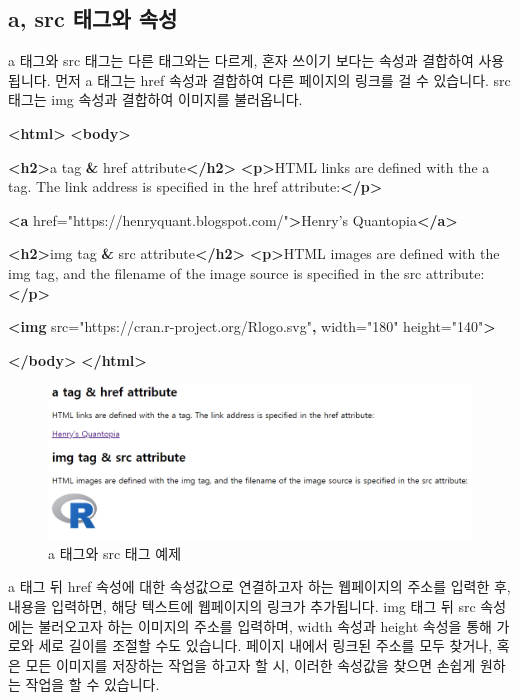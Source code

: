 \documentclass[]{book}
\newenvironment{Shaded}{\begin{snugshade}}{\end{snugshade}}
\newcommand{\ErrorTok}[1]{\textcolor[rgb]{0.64,0.00,0.00}{\textbf{#1}}}
\newcommand{\KeywordTok}[1]{\textcolor[rgb]{0.13,0.29,0.53}{\textbf{#1}}}
\newcommand{\NormalTok}[1]{#1}
\newcommand{\OtherTok}[1]{\textcolor[rgb]{0.56,0.35,0.01}{#1}}
\newcommand{\StringTok}[1]{\textcolor[rgb]{0.31,0.60,0.02}{#1}}
\begin{document}
\hypertarget{a-src--}{%
\subsection{a, src 태그와 속성}\label{a-src--}}

a 태그와 src 태그는 다른 태그와는 다르게, 혼자 쓰이기 보다는 속성과 결합하여 사용됩니다. 먼저 a 태그는 href 속성과 결합하여 다른 페이지의 링크를 걸 수 있습니다. src 태그는 img 속성과 결합하여 이미지를 불러옵니다.

\begin{Shaded}
\begin{Highlighting}[]
\KeywordTok{<html>}
\KeywordTok{<body>}

\KeywordTok{<h2>}\NormalTok{a tag }\ErrorTok{&}\NormalTok{ href attribute}\KeywordTok{</h2>}
\KeywordTok{<p>}\NormalTok{HTML links are defined with the a tag. The link address is specified in the href attribute:}\KeywordTok{</p>}

\KeywordTok{<a}\OtherTok{ href=}\StringTok{"https://henryquant.blogspot.com/"}\KeywordTok{>}\NormalTok{Henry's Quantopia}\KeywordTok{</a>}

\KeywordTok{<h2>}\NormalTok{img tag }\ErrorTok{&}\NormalTok{ src attribute}\KeywordTok{</h2>}
\KeywordTok{<p>}\NormalTok{HTML images are defined with the img tag,}
\NormalTok{and the filename of the image source is specified in the src attribute:}\KeywordTok{</p>}

\KeywordTok{<img}\OtherTok{ src=}\StringTok{"https://cran.r-project.org/Rlogo.svg"}\ErrorTok{,}\OtherTok{ width=}\StringTok{"180"}\OtherTok{ height=}\StringTok{"140"}\KeywordTok{>}

\KeywordTok{</body>}
\KeywordTok{</html>}
\end{Highlighting}
\end{Shaded}

\begin{figure}

{\centering \includegraphics[width=0.5\linewidth]{images/html_6} 

}

\caption{a 태그와 src 태그 예제}\label{fig:unnamed-chunk-18}
\end{figure}

a 태그 뒤 href 속성에 대한 속성값으로 연결하고자 하는 웹페이지의 주소를 입력한 후, 내용을 입력하면, 해당 텍스트에 웹페이지의 링크가 추가됩니다. img 태그 뒤 src 속성에는 불러오고자 하는 이미지의 주소를 입력하며, width 속성과 height 속성을 통해 가로와 세로 길이를 조절할 수도 있습니다. 페이지 내에서 링크된 주소를 모두 찾거나, 혹은 모든 이미지를 저장하는 작업을 하고자 할 시, 이러한 속성값을 찾으면 손쉽게 원하는 작업을 할 수 있습니다.
\end{document}
